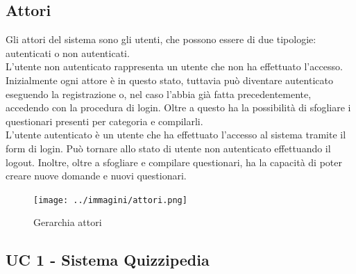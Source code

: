 \documentclass[a4paper,11pt]{article}
\begin{document}
\subsection{Attori}
Gli attori del sistema sono gli utenti, che possono essere di due tipologie: autenticati o non autenticati.\\ 
L'utente non autenticato rappresenta un utente che non ha effettuato l'accesso. Inizialmente ogni attore è in questo stato, tuttavia può diventare autenticato eseguendo la registrazione o, nel caso l'abbia già fatta precedentemente, accedendo con la procedura di login. Oltre a questo ha la possibilità di  sfogliare i questionari presenti per categoria e compilarli.\\
L'utente autenticato è un utente che ha effettuato l'accesso al sistema tramite il form di login. Può tornare allo stato di utente non autenticato effettuando il logout. Inoltre, oltre a sfogliare e compilare questionari, ha la capacità di poter creare nuove domande e nuovi questionari.\\

\begin{figure}[h!]
\centering
\texttt{[image: ../immagini/attori.png]}
\caption{Gerarchia attori}
\end{figure}

\newpage
\subsection{UC 1 - Sistema Quizzipedia}
\end{document}
